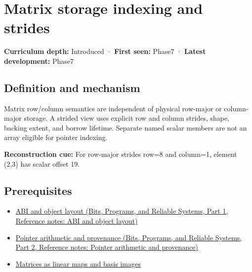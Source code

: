 \hypertarget{appendix-ffdc1d4e5350}{}\label{referencestart:appendix-ffdc1d4e5350}
\section{Matrix storage indexing and strides}\label{appendix-ffdc1d4e5350-matrix-storage-indexing-and-strides}

\hypertarget{appendix-ffdc1d4e5350-matrix-storage-indexing-and-strides}{}

\textbf{Curriculum depth:} Introduced · \textbf{First seen:} Phase7 · \textbf{Latest development:} Phase7

\begin{allmightroledefinition}

\subsection{Definition and mechanism}\label{appendix-ffdc1d4e5350-definition-and-mechanism}

\hypertarget{appendix-ffdc1d4e5350-definition-and-mechanism}{}

Matrix row/column semantics are independent of physical row-major or column-major storage. A strided view uses explicit row and column strides, shape, backing extent, and borrow lifetime. Separate named scalar members are not an array eligible for pointer indexing.

\end{allmightroledefinition}

\textbf{Reconstruction cue:} For row-major strides row=8 and column=1, element (2,3) has scalar offset 19.

\subsection{Prerequisites}\label{appendix-ffdc1d4e5350-prerequisites}

\hypertarget{appendix-ffdc1d4e5350-prerequisites}{}

\begin{itemize}
\tightlist
\item
  \href{../01-Bits-Programs-and-Reliable-Systems-P01/main.pdf\#nameddest=appendix-c4ac6bb0fff8}{ABI and object layout (Bits, Programs, and Reliable Systems, Part 1, Reference notes: ABI and object layout)}
\item
  \href{../01-Bits-Programs-and-Reliable-Systems-P02/main.pdf\#nameddest=appendix-6af5921bc853}{Pointer arithmetic and provenance (Bits, Programs, and Reliable Systems, Part 2, Reference notes: Pointer arithmetic and provenance)}
\item
  \hyperref[appendix-bd39c3bf5d64]{Matrices as linear maps and basis images}
\end{itemize}

